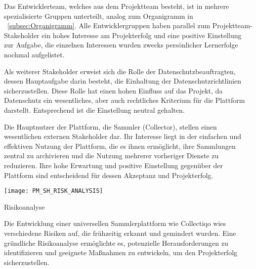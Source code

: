 Das Entwicklerteam, welches aus dem Projektteam besteht, ist in mehrere spezialisierte Gruppen unterteilt, analog zum Organigramm in ~\ref{subsec:Organigramm}.
Alle Entwicklergruppen haben parallel zum Projektteam-Stakeholder ein hohes Interesse am Projekterfolg und eine positive Einstellung zur Aufgabe, die einzelnen Interessen wurden zwecks persönlicher Lernerfolge nochmal aufgelistet. \par

Als weiterer Stakeholder erweist sich die Rolle der Datenschutzbeauftragten, dessen Hauptaufgabe darin besteht, die Einhaltung der Datenschutzrichtlinien sicherzustellen.
Diese Rolle hat einen hohen Einfluss auf das Projekt, da Datenschutz ein wesentliches, aber auch rechtliches Kriterium für die Plattform darstellt.
Entsprechend ist die Einstellung neutral gehalten. \par


Die Hauptnutzer der Plattform, die Sammler (Collector), stellen einen wesentlichen externen Stakeholder dar.
Ihr Interesse liegt in der einfachen und effektiven Nutzung der Plattform, die es ihnen ermöglicht, ihre Sammlungen zentral zu archivieren und die Nutzung mehrerer vorheriger Dienste zu reduzieren.
Ihre hohe Erwartung und positive Einstellung gegenüber der Plattform sind entscheidend für dessen Akzeptanz und Projekterfolg. \par


\begin{table}[h!]
    \centering
    \texttt{[image: PM\_SH\_RISK\_ANALYSIS]}
    \caption{Risikoanalyse}
\end{table}

Die Entwicklung einer universellen Sammlerplattform wie Collectiqo wies verschiedene Risiken auf, die frühzeitig erkannt und gemindert wurden.
Eine gründliche Risikoanalyse ermöglichte es, potenzielle Herausforderungen zu identifizieren und geeignete Maßnahmen zu entwickeln, um den Projekterfolg sicherzustellen.

